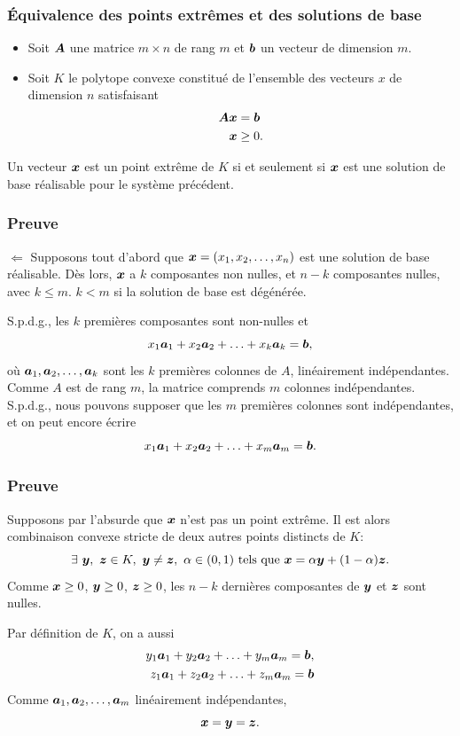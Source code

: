 \documentclass[usepdftitle=false]{beamer}
\begin{document}
\begin{frame}
\frametitle{\'Equivalence des points extrêmes et des solutions de base}

\begin{itemize}
\item
Soit ${\boldsymbol{A}}$ une matrice $m \times n$ de rang $m$ et ${\boldsymbol{b}}$ un vecteur de dimension $m$.
\item
Soit $K$ le polytope convexe constitué de l'ensemble des vecteurs $x$ de dimension $n$ satisfaisant
\begin{align*}
{\boldsymbol{A}} {\boldsymbol{x}} &= {\boldsymbol{b}} \\
{\boldsymbol{x}} & \geq 0.
\end{align*}
\end{itemize}
Un vecteur ${\boldsymbol{x}}$ est un point extrême de $K$ si et seulement si ${\boldsymbol{x}}$ est une solution de base réalisable pour le système précédent.

\end{frame}

\begin{frame}
\frametitle{Preuve}

$\Leftarrow$ Supposons tout d'abord que ${\boldsymbol{x}} = (x_1, x_2, \ldots, x_n)$ est une solution de base réalisable.
Dès lors, ${\boldsymbol{x}}$ a $k$ composantes non nulles, et $n-k$ composantes nulles, avec $k \leq m$. $k < m$ si la solution de base est dégénérée.

\mbox{}

S.p.d.g., les $k$ premières composantes sont non-nulles et
\[
  x_1 {\boldsymbol{a}}_1 + x_2 {\boldsymbol{a}}_2 + \ldots + x_k {\boldsymbol{a}}_k = {\boldsymbol{b}},
\]
où ${\boldsymbol{a}}_1, {\boldsymbol{a}}_2, \ldots, {\boldsymbol{a}}_k$ sont les $k$ premières colonnes de $A$, linéairement indépendantes. Comme $A$ est de rang $m$, la matrice comprends $m$ colonnes indépendantes. S.p.d.g., nous pouvons supposer que les $m$ premières colonnes sont indépendantes, et on peut encore écrire
\[
x_1 {\boldsymbol{a}}_1 + x_2 {\boldsymbol{a}}_2 + \ldots + x_m {\boldsymbol{a}}_m = {\boldsymbol{b}}.
\]

\end{frame}

\begin{frame}
\frametitle{Preuve}

Supposons par l'absurde que ${\boldsymbol{x}}$ n'est pas un point extrême. Il est alors combinaison convexe stricte de deux autres points distincts de $K$:
\[
\exists \ {\boldsymbol{y}},\ {\boldsymbol{z}} \in K,\ {\boldsymbol{y}} \ne {\boldsymbol{z}}, \ \alpha \in (0,1) \ \mbox{tels que}\ {\boldsymbol{x}} = \alpha {\boldsymbol{y}} + (1-\alpha) {\boldsymbol{z}}.
\]
Comme ${\boldsymbol{x}} \geq 0$, ${\boldsymbol{y}} \geq 0$, ${\boldsymbol{z}} \geq 0$, les $n-k$ dernières composantes de ${\boldsymbol{y}}$ et ${\boldsymbol{z}}$ sont nulles.

\mbox{}

Par définition de $K$, on a aussi
\begin{align*}
y_1 {\boldsymbol{a}}_1 + y_2 {\boldsymbol{a}}_2 + \ldots + y_m {\boldsymbol{a}}_m = {\boldsymbol{b}}, \\
z_1 {\boldsymbol{a}}_1 + z_2 {\boldsymbol{a}}_2 + \ldots + z_m {\boldsymbol{a}}_m = {\boldsymbol{b}}
\end{align*}
Comme ${\boldsymbol{a}}_1, {\boldsymbol{a}}_2, \ldots, {\boldsymbol{a}}_m$ linéairement indépendantes,
$$
{\boldsymbol{x}} = {\boldsymbol{y}} = {\boldsymbol{z}}.
$$

\end{frame}
\end{document}
